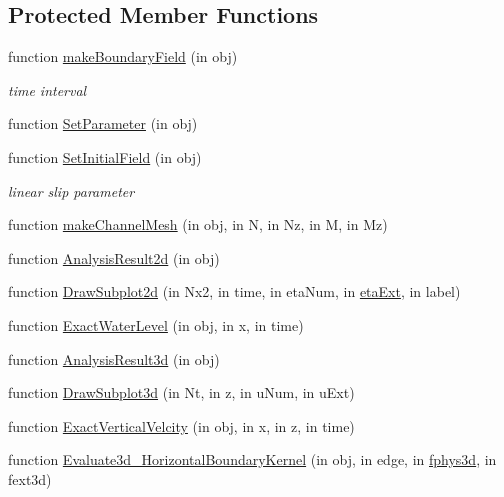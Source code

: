 \subsection*{Protected Member Functions}
\begin{DoxyCompactItemize}
\item 
function \hyperlink{class_open_channel_varying_bottom3d_a9650ec2e83bc6ffefa14e31be2754e63}{make\+Boundary\+Field} (in obj)
\begin{DoxyCompactList}\small\item\em time interval \end{DoxyCompactList}\item 
function \hyperlink{class_open_channel_varying_bottom3d_a663638b9f6eab40ac1e04ac6a3e84e7a}{Set\+Parameter} (in obj)
\item 
function \hyperlink{class_open_channel_varying_bottom3d_a463c23b638ed33bba26664a7c763cf67}{Set\+Initial\+Field} (in obj)
\begin{DoxyCompactList}\small\item\em linear slip parameter \end{DoxyCompactList}\item 
function \hyperlink{class_open_channel_varying_bottom3d_aae1d0bc4df5389bf0f9dfa24276ea746}{make\+Channel\+Mesh} (in obj, in N, in Nz, in M, in Mz)
\item 
function \hyperlink{class_open_channel_varying_bottom3d_ab00e3594f91f25222bf6b801b4780bff}{Analysis\+Result2d} (in obj)
\item 
function \hyperlink{class_open_channel_varying_bottom3d_ac5e58138c6361d22b71ab7278055ff5d}{Draw\+Subplot2d} (in Nx2, in time, in eta\+Num, in \hyperlink{class_open_channel_varying_bottom3d_af9f5131d6b648db3a59015b68636d4b4}{eta\+Ext}, in label)
\item 
function \hyperlink{class_open_channel_varying_bottom3d_a4c8336ab8cddaf39caaa3d7cc6a89dee}{Exact\+Water\+Level} (in obj, in x, in time)
\item 
function \hyperlink{class_open_channel_varying_bottom3d_aee5862482b3dd1fbb180bc20839d5541}{Analysis\+Result3d} (in obj)
\item 
function \hyperlink{class_open_channel_varying_bottom3d_abf7be912dc1dfb0d292d9bb1e38fe32a}{Draw\+Subplot3d} (in Nt, in z, in u\+Num, in u\+Ext)
\item 
function \hyperlink{class_open_channel_varying_bottom3d_a8b6933a654e2ca55c1cbe74cfacc15db}{Exact\+Vertical\+Velcity} (in obj, in x, in z, in time)
\item 
function \hyperlink{class_open_channel_varying_bottom3d_a03dd4e4120aab8d2668f42cd39a7a19c}{Evaluate3d\+\_\+\+Horizontal\+Boundary\+Kernel} (in obj, in edge, in \hyperlink{class_l_s_w_e_abstract3d_a85a25b72732b21d0d624e9f88ed52dc4}{fphys3d}, in fext3d)

\end{DoxyCompactItemize}
